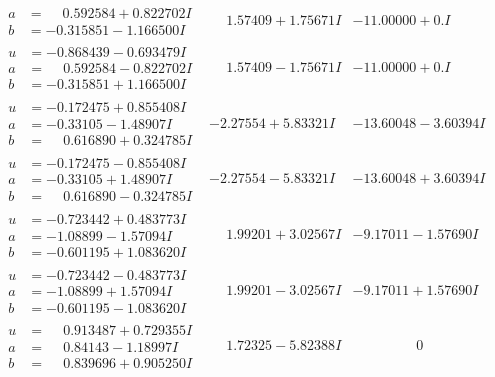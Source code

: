 \documentclass[1p]{elsarticle_modified}
\theoremstyle{definition}
\begin{document}
$$\begin{array}{c|c|c}
\begin{aligned}
a &= \phantom{-}0.592584 + 0.822702 I \\
b &= -0.315851 - 1.166500 I\end{aligned}
 & \phantom{-}1.57409 + 1.75671 I & -11.00000 + 0. I\phantom{ +0.000000I} \\ \hline\begin{aligned}
u &= -0.868439 - 0.693479 I \\
a &= \phantom{-}0.592584 - 0.822702 I \\
b &= -0.315851 + 1.166500 I\end{aligned}
 & \phantom{-}1.57409 - 1.75671 I & -11.00000 + 0. I\phantom{ +0.000000I} \\ \hline\begin{aligned}
u &= -0.172475 + 0.855408 I \\
a &= -0.33105 - 1.48907 I \\
b &= \phantom{-}0.616890 + 0.324785 I\end{aligned}
 & -2.27554 + 5.83321 I & -13.60048 - 3.60394 I \\ \hline\begin{aligned}
u &= -0.172475 - 0.855408 I \\
a &= -0.33105 + 1.48907 I \\
b &= \phantom{-}0.616890 - 0.324785 I\end{aligned}
 & -2.27554 - 5.83321 I & -13.60048 + 3.60394 I \\ \hline\begin{aligned}
u &= -0.723442 + 0.483773 I \\
a &= -1.08899 - 1.57094 I \\
b &= -0.601195 + 1.083620 I\end{aligned}
 & \phantom{-}1.99201 + 3.02567 I & -9.17011 - 1.57690 I \\ \hline\begin{aligned}
u &= -0.723442 - 0.483773 I \\
a &= -1.08899 + 1.57094 I \\
b &= -0.601195 - 1.083620 I\end{aligned}
 & \phantom{-}1.99201 - 3.02567 I & -9.17011 + 1.57690 I \\ \hline\begin{aligned}
u &= \phantom{-}0.913487 + 0.729355 I \\
a &= \phantom{-}0.84143 - 1.18997 I \\
b &= \phantom{-}0.839696 + 0.905250 I\end{aligned}
 & \phantom{-}1.72325 - 5.82388 I & \phantom{-0.000000 } 0 \\ \hline\begin{aligned}

\end{aligned}
\end{array}$$
\end{document}
